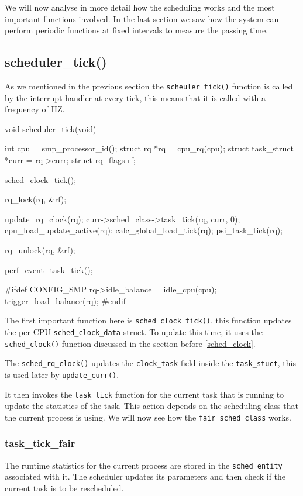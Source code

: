 \documentclass[10pt, oneside]{book}
\begin{document}
We will now analyse in more detail how the scheduling works and the most important functions involved. In the last section we saw how the system can perform periodic functions at fixed intervals to measure the passing time.

\subsection{scheduler\_tick()}

As we mentioned in the previous section the \verb|scheuler_tick()|  function is called by the interrupt handler at every tick, this means that it is called with a frequency of HZ.

\begin{code}
void scheduler_tick(void)
{
  int cpu = smp_processor_id();
  struct rq *rq = cpu_rq(cpu);
  struct task_struct *curr = rq->curr;
  struct rq_flags rf;

  sched_clock_tick();

  rq_lock(rq, &rf);

  update_rq_clock(rq);
  curr->sched_class->task_tick(rq, curr, 0);
  cpu_load_update_active(rq);
  calc_global_load_tick(rq);
  psi_task_tick(rq);

  rq_unlock(rq, &rf);

  perf_event_task_tick();

#ifdef CONFIG_SMP
  rq->idle_balance = idle_cpu(cpu);
  trigger_load_balance(rq);
#endif
}
\end{code}

The first important function here is \verb|sched_clock_tick()|, this function updates the per-CPU \verb|sched_clock_data| struct. To update this time, it uses the \verb|sched_clock()| function discussed in the section before \ref{sched_clock}.

The \verb|sched_rq_clock()| updates the \verb|clock_task| field inside the \verb|task_stuct|, this is used later by \verb|update_curr()|.

It then invokes the \verb|task_tick| function for the current task that is running to update the statistics of the task. This action depends on the scheduling class that the current process is using. We will now see how the \verb|fair_sched_class| works.

\subsubsection{task\_tick\_fair}

The runtime statistics for the current process are stored in the \verb|sched_entity| associated with it. The scheduler updates its parameters and then check if the current task is to be rescheduled. 
\end{document}
